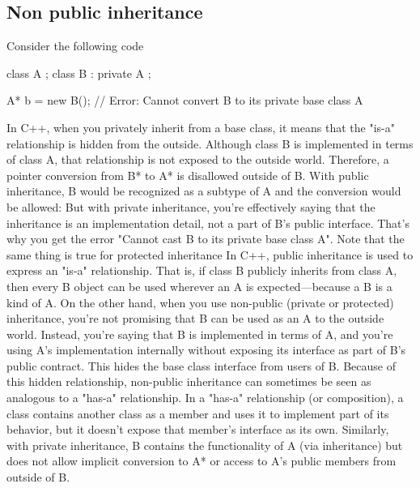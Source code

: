\documentclass{report}
\begin{document}
\bigbreak \noindent 
\subsection{Non public inheritance}
\bigbreak \noindent 
Consider the following code
\bigbreak \noindent 
\begin{cppcode}
class A { };
class B : private A { };

A* b = new B(); // Error: Cannot convert B to its private base class A 
\end{cppcode}
\bigbreak \noindent 
In C++, when you privately inherit from a base class, it means that the "is-a" relationship is hidden from the outside. Although class B is implemented in terms of class A, that relationship is not exposed to the outside world. Therefore, a pointer conversion from B* to A* is disallowed outside of B.
\bigbreak \noindent 
With public inheritance, B would be recognized as a subtype of A and the conversion would be allowed:
\bigbreak \noindent 
But with private inheritance, you're effectively saying that the inheritance is an implementation detail, not a part of B's public interface. That's why you get the error "Cannot cast B to its private base class A".
\bigbreak \noindent 
Note that the same thing is true for protected inheritance
\bigbreak \noindent 
In C++, public inheritance is used to express an "is-a" relationship. That is, if class B publicly inherits from class A, then every B object can be used wherever an A is expected—because a B is a kind of A.
\bigbreak \noindent 
On the other hand, when you use non-public (private or protected) inheritance, you're not promising that B can be used as an A to the outside world. Instead, you're saying that B is implemented in terms of A, and you're using A's implementation internally without exposing its interface as part of B's public contract. This hides the base class interface from users of B.
\bigbreak \noindent 
Because of this hidden relationship, non-public inheritance can sometimes be seen as analogous to a "has-a" relationship. In a "has-a" relationship (or composition), a class contains another class as a member and uses it to implement part of its behavior, but it doesn't expose that member's interface as its own. Similarly, with private inheritance, B contains the functionality of A (via inheritance) but does not allow implicit conversion to A* or access to A's public members from outside of B.

\bigbreak \noindent 
\end{document}
